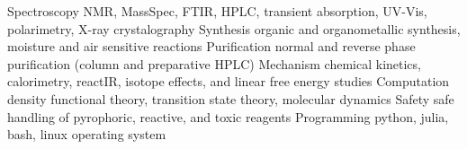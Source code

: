 

\begin{cvskills}

  \cvskill
  {Spectroscopy} %
  {NMR, MassSpec, FTIR, HPLC, transient absorption, UV-Vis, polarimetry, X-ray crystalography} %
  \cvskill
  {Synthesis} %
  {organic and organometallic synthesis, moisture and air sensitive reactions} %
  \cvskill
  {Purification} %
  {normal and reverse phase purification (column and preparative HPLC) } %
  \cvskill
  {Mechanism} %
  {chemical kinetics, calorimetry, reactIR, isotope effects, and linear free energy studies} %
  \cvskill
  {Computation} %
  {density functional theory, transition state theory, molecular dynamics} %
  \cvskill
  {Safety} %
  {safe handling of pyrophoric, reactive, and toxic reagents} %
  \cvskill
  {Programming} %
  {python, julia, bash, linux operating system} %

\end{cvskills}
